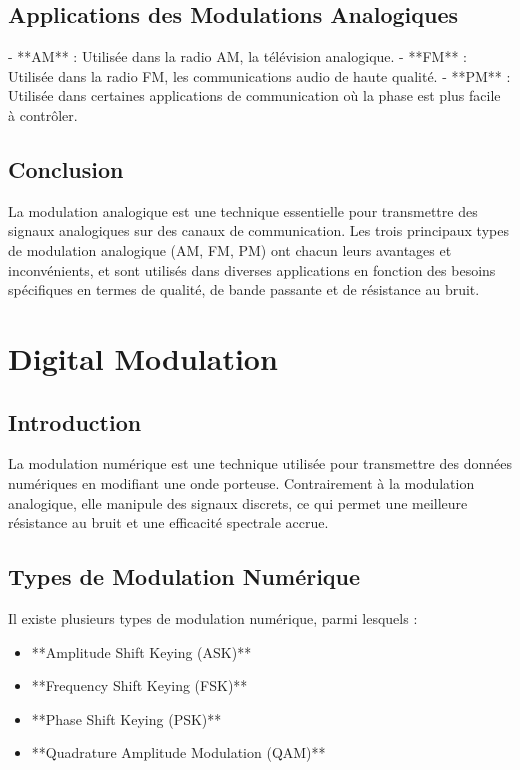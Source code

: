 \documentclass[10pt,a4paper]{article}
\begin{document}
\subsection*{Applications des Modulations Analogiques}
- **AM** : Utilisée dans la radio AM, la télévision analogique.
- **FM** : Utilisée dans la radio FM, les communications audio de haute qualité.
- **PM** : Utilisée dans certaines applications de communication où la phase est plus facile à contrôler.

\subsection*{Conclusion}
La modulation analogique est une technique essentielle pour transmettre des signaux analogiques sur des canaux de communication. Les trois principaux types de modulation analogique (AM, FM, PM) ont chacun leurs avantages et inconvénients, et sont utilisés dans diverses applications en fonction des besoins spécifiques en termes de qualité, de bande passante et de résistance au bruit.

\section*{Digital Modulation}

\subsection*{Introduction}
La modulation numérique est une technique utilisée pour transmettre des données numériques en modifiant une onde porteuse. Contrairement à la modulation analogique, elle manipule des signaux discrets, ce qui permet une meilleure résistance au bruit et une efficacité spectrale accrue.

\subsection*{Types de Modulation Numérique}
Il existe plusieurs types de modulation numérique, parmi lesquels :
\begin{itemize}
    \item **Amplitude Shift Keying (ASK)**
    \item **Frequency Shift Keying (FSK)**
    \item **Phase Shift Keying (PSK)**
    \item **Quadrature Amplitude Modulation (QAM)**
\end{itemize}
\end{document}
